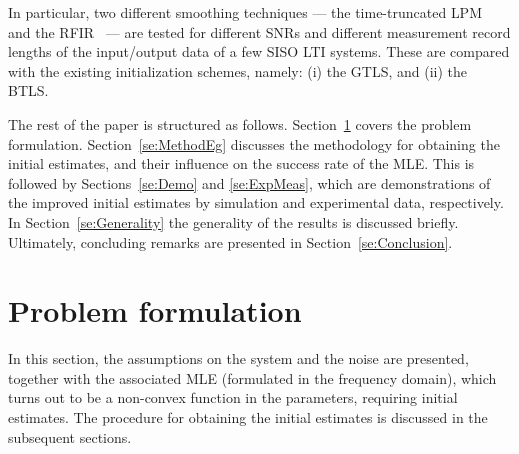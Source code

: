 In particular, two different smoothing techniques --- the time-truncated \gls{LPM}~\citep{Lumori2014TIM} and the \gls{RFIR}~\citep{Pillonetto2010,Chen2012} --- are tested for different \glspl{SNR} and different measurement record lengths of the input/output data of a few \gls{SISO} \gls{LTI} systems.
These are compared with the existing initialization schemes, namely: (i) the \gls{GTLS}, and (ii) the \gls{BTLS}.

The rest of the paper is structured as follows. Section~\ref{se:ProbForm} covers the problem formulation. Section~\ref{se:MethodEg} discusses the methodology for obtaining the initial estimates, and their influence on the success rate of the \gls{MLE}. 
This is followed by Sections~\ref{se:Demo} and \ref{se:ExpMeas}, which are demonstrations of the improved initial estimates by simulation and experimental data, respectively.
In Section~\ref{se:Generality} the generality of the results is discussed briefly.
Ultimately, concluding remarks are presented in Section~\ref{se:Conclusion}.


\section{Problem formulation}\label{se:ProbForm}


In this section, the assumptions on the system and the noise are presented, together with the associated MLE (formulated in the frequency domain), which turns out to be a non-convex function in the parameters, requiring initial estimates. The procedure for obtaining the initial estimates is discussed in the subsequent sections.

